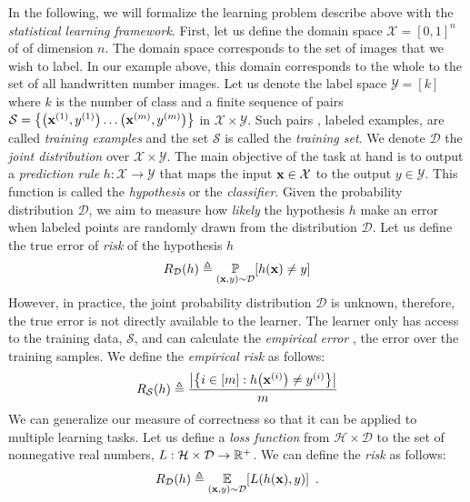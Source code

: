 In the following, we will formalize the learning problem describe above with the \emph{statistical learning framework}.
First, let us define the domain space $\mathcal{X} = [0, 1]^n$ of of dimension $n$.
The domain space corresponds to the set of images that we wish to label.
In our example above, this domain corresponds to the whole to the set of all handwritten number images.
Let us denote the label space $\mathcal{Y} = [k]$ where $k$ is the number of class and a finite sequence of pairs $\mathcal{S} = \left\{ \left(\xvec^{(1)}, y^{(1)} \right) \dots \left( \xvec^{(m)}, y^{(m)} \right) \right\}$ in $\mathcal{X} \times \mathcal{Y}$. 
Such pairs \ie, labeled examples, are called \emph{training examples} and the set $\mathcal{S}$ is called the \emph{training set}.
We denote $\mathcal{D}$ the \emph{joint distribution} over $\mathcal{X} \times \mathcal{Y}$.
The main objective of the task at hand is to output a \emph{prediction rule} $h: \mathcal{X} \rightarrow \mathcal{Y}$ that maps the input $\mathbf{x} \in \mathcal{X}$ to the output $y \in \mathcal{Y}$.
This function is called the \emph{hypothesis} or the \emph{classifier}. 
Given the probability distribution $\mathcal{D}$, we aim to measure how \emph{likely} the hypothesis $h$ make an error when labeled points are randomly drawn from the distribution $\mathcal{D}$.
Let us define the true error of \emph{risk} of the hypothesis $h$
\begin{equation}
  R_{\mathcal{D}}(h) \triangleq \Pbb_{(\xvec, y) \sim \mathcal{D}} \left[ h(\xvec) \neq  y \right] 
  \label{equation:ch2-risk1}
\end{equation}
However, in practice, the joint probability distribution $\mathcal{D}$ is unknown, therefore, the true error is not directly available to the learner.
The learner only has access to the training data, $\mathcal{S}$, and can calculate the \emph{empirical error} \ie, the error over the training samples.
We define the \emph{empirical risk} as follows:
\begin{equation}
  R_{\mathcal{S}}(h) \triangleq \frac{\left| \left\{i \in [m]: h\left(\xvec^{(i)}\right) \neq y^{(i)} \right\}\right|}{m}
\end{equation}
We can generalize our measure of correctness so that it can be applied to multiple learning tasks.
Let us define a \emph{loss function} from $\mathcal{H} \times \mathcal{D}$ to the set of nonnegative real numbers, $L: \mathcal{H} \times \mathcal{D} \rightarrow \mathbb{R}^{+}$.
We can define the \emph{risk} as follows:
\begin{equation}
  R_{\mathcal{D}}(h) \triangleq \Ebb_{(\xvec, y) \sim \mathcal{D}} \left[ L(h(\xvec), y) \right] \enspace.
  \label{equation:ch2-risk2}
\end{equation}
